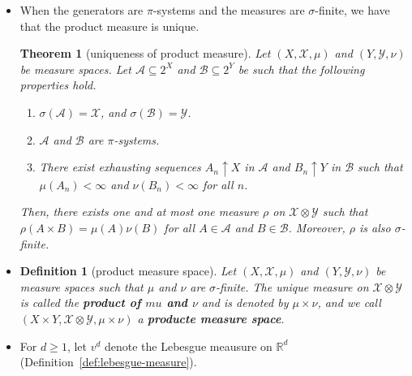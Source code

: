 \documentclass[10pt]{article}
\newtheorem{theorem}[lemma]{Theorem}
\newtheorem{definition}[lemma]{Definition}
\newtheorem{proposition}[lemma]{Proposition}
\numberwithin{lemma}{section}
\newcommand{\mcal}[1]{\mathcal{#1}}
\newcommand{\Real}{\mathbb{R}}
\begin{document}
\begin{itemize}
  \begin{proposition}
    Let $X$ and $Y$ be sets. Let $\mcal{A} \subseteq 2^X$ and $\mcal{B} \subseteq 2^Y$ be collections of sets. Let $\mcal{X} = \sigma(\mcal{A})$, and $\mcal{Y} = \sigma(\mcal{B})$. If $\mcal{A}$ exhausts $X$ and $\mcal{B}$ exhausts $Y$, then
    \begin{align*}
      \sigma(\mcal{A} \times \mcal{B}) = \sigma(\mcal{X} \times \mcal{Y}) = \mcal{X} \otimes \mcal{Y}.
    \end{align*}
  \end{proposition}

  \item When the generators are $\pi$-systems and the measures are $\sigma$-finite, we have that the product measure is unique. 
  \begin{theorem}[uniqueness of product measure]
    Let $(X, \mcal{X}, \mu)$ and $(Y, \mcal{Y}, \nu)$ be measure spaces. Let $\mcal{A} \subseteq 2^X$ and $\mcal{B} \subseteq 2^Y$ be such that the following properties hold.
    \begin{enumerate}
      \item $\sigma(\mcal{A}) = \mcal{X}$, and $\sigma(\mcal{B}) = \mcal{Y}$.
      \item $\mcal{A}$ and $\mcal{B}$ are $\pi$-systems.
      \item There exist exhausting sequences $A_n \uparrow X$ in $\mcal{A}$ and $B_n \uparrow Y$ in $\mcal{B}$ such that $\mu(A_n) < \infty$ and $\nu(B_n) < \infty$ for all $n$.  
    \end{enumerate}
    Then, there exists one and at most one measure $\rho$ on $\mcal{X} \otimes \mcal{Y}$ such that $\rho(A \times B) = \mu(A) \nu(B)$ for all $A \in \mcal{A}$ and $B \in \mcal{B}$. Moreover, $\rho$ is also $\sigma$-finite.
  \end{theorem}

  \item \begin{definition}[product measure space]
    Let $(X, \mcal{X}, \mu)$ and $(Y, \mcal{Y}, \nu)$ be measure spaces such that $\mu$ and $\nu$ are $\sigma$-finite. The unique measure on $\mcal{X} \otimes \mcal{Y}$ is called the {\bf product of $mu$ and $\nu$} and is denoted by $\mu \times \nu$, and we call $(X \times Y, \mcal{X} \otimes \mcal{Y}, \mu \times \nu)$ a {\bf producte measure space}.
  \end{definition}

  \item For $d \geq 1$, let $v^d$ denote the Lebesgue meausure on $\Real^d$ (Definition~\ref{def:lebesgue-measure}).
  

\end{itemize}
\end{document}
